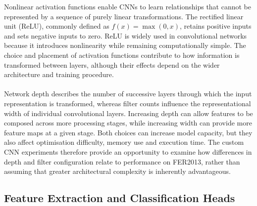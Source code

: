 \documentclass[12pt, a4paper]{report}
\let\oldsubsection\subsection
\renewcommand{\subsection}{%
    \Needspace{6\baselineskip}%
    \oldsubsection
}
\begin{document}
				Nonlinear activation functions enable CNNs to learn relationships that cannot be represented by a sequence of purely linear transformations. The rectified linear unit (ReLU), commonly defined as $f(x)=\max(0,x)$, retains positive inputs and sets negative inputs to zero. ReLU is widely used in convolutional networks because it introduces nonlinearity while remaining computationally simple. The choice and placement of activation functions contribute to how information is transformed between layers, although their effects depend on the wider architecture and training procedure.\\\\
				 Network depth describes the number of successive layers through which the input representation is transformed, whereas filter counts influence the representational width of individual convolutional layers. Increasing depth can allow features to be composed across more processing stages, while increasing width can provide more feature maps at a given stage. Both choices can increase model capacity, but they also affect optimisation difficulty, memory use and execution time. The custom CNN experiments therefore provide an opportunity to examine how differences in depth and filter configuration relate to performance on FER2013, rather than assuming that greater architectural complexity is inherently advantageous.
				
			\subsection{Feature Extraction and Classification Heads}
				
\end{document}

